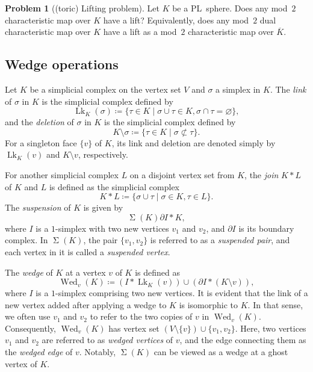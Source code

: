 \documentclass[11pt]{amsart}
\theoremstyle{plain}
\numberwithin{equation}{section}
\theoremstyle{definition}
\newtheorem{problem}[theorem]{Problem}
\DeclareMathOperator{\lk}{Lk}
\DeclareMathOperator{\wed}{Wed}
\DeclareMathOperator{\susp}{\Sigma}
\begin{document}
\begin{problem}[(toric) Lifting problem] \label{equiv_problem}
    Let $K$ be a PL~sphere.
    Does any mod~$2$ characteristic map over $K$ have a lift?
    Equivalently, does any mod~$2$ dual characteristic map over $K$ have a lift as a mod~$2$ characteristic map over $\overline{K}$.
\end{problem}



\subsection{Wedge operations}
Let $K$ be a simplicial complex on the vertex set $V$ and $\sigma$ a simplex in $K$.
The \emph{link} of $\sigma$ in $K$ is the simplicial complex defined by
$$
    \lk_K(\sigma) \coloneqq \{\tau \in K \mid \sigma \cup \tau \in K, \sigma \cap \tau = \varnothing\},
$$
and the \emph{deletion} of $\sigma$ in $K$ is the simplicial complex defined by
$$
    K \setminus \sigma \coloneqq \{\tau \in K \mid \sigma \not\subset \tau\}.
$$
For a singleton face $\{v\}$ of $K$, its link and deletion are denoted simply by $\lk_K (v)$ and $K \setminus v$, respectively.

For another simplicial complex $L$ on a disjoint vertex set from $K$, the \emph{join} $K \ast L$ of $K$ and $L$ is defined as the simplicial complex
$$
    K \ast L \coloneqq \{\sigma \cup \tau \mid \sigma \in K, \tau \in L \}.
$$
The \emph{suspension} of $K$ is given by
$$
    \susp(K) \partial I \ast K,
$$
where $I$ is a $1$-simplex with two new vertices $v_1$ and $v_2$, and $\partial I$ is its boundary complex.
In $\susp(K)$, the pair $\{v_1, v_2\}$ is referred to as a \emph{suspended pair}, and each vertex in it is called a \emph{suspended vertex}.

The \emph{wedge} of $K$ at a vertex $v$ of $K$ is defined as
$$
    \wed_v(K) \coloneqq (I \ast \lk_K(v)) \cup (\partial I \ast (K \setminus v)),
$$
where $I$ is a $1$-simplex comprising two new vertices.
It is evident that the link of a new vertex added after applying a wedge to $K$ is isomorphic to $K$.
In that sense, we often use $v_1$ and $v_2$ to refer to the two copies of $v$ in $\wed_v(K)$.
Consequently, $\wed_v(K)$ has vertex set $(V \setminus \{v\}) \cup \{v_1, v_2\}$.
Here, two vertices $v_1$ and $v_2$ are referred to as \emph{wedged vertices} of $v$, and the edge connecting them as the \emph{wedged edge} of $v$.
Notably, $\susp(K)$ can be viewed as a wedge at a ghost vertex of $K$.
\end{document}
